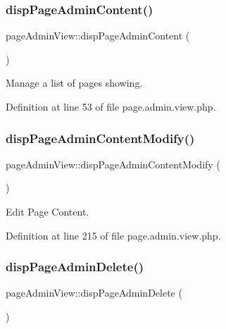 \subsubsection{\texorpdfstring{disp\+Page\+Admin\+Content()}{dispPageAdminContent()}}
{\footnotesize\ttfamily page\+Admin\+View\+::disp\+Page\+Admin\+Content (\begin{DoxyParamCaption}{ }\end{DoxyParamCaption})}



Manage a list of pages showing. 



Definition at line 53 of file page.\+admin.\+view.\+php.

\mbox{\label{classpageAdminView_a3396afbab0397643febdf26626c04199}} 
\subsubsection{\texorpdfstring{disp\+Page\+Admin\+Content\+Modify()}{dispPageAdminContentModify()}}
{\footnotesize\ttfamily page\+Admin\+View\+::disp\+Page\+Admin\+Content\+Modify (\begin{DoxyParamCaption}{ }\end{DoxyParamCaption})}



Edit Page Content. 



Definition at line 215 of file page.\+admin.\+view.\+php.

\mbox{\label{classpageAdminView_afd16fd9dd0c023d73bec88649ed843f9}} 
\subsubsection{\texorpdfstring{disp\+Page\+Admin\+Delete()}{dispPageAdminDelete()}}
{\footnotesize\ttfamily page\+Admin\+View\+::disp\+Page\+Admin\+Delete (\begin{DoxyParamCaption}{ }\end{DoxyParamCaption})}



